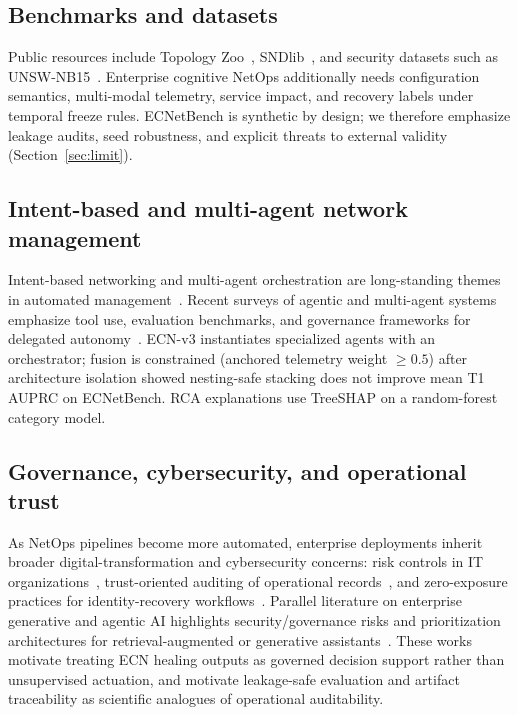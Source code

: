 \subsection{Benchmarks and datasets}
Public resources include Topology Zoo~\cite{knight2011topologyzoo}, SNDlib~\cite{orlowski2010sndlib}, and security datasets such as UNSW-NB15~\cite{moustafa2015unsw}. Enterprise cognitive NetOps additionally needs configuration semantics, multi-modal telemetry, service impact, and recovery labels under temporal freeze rules. ECNetBench is synthetic by design; we therefore emphasize leakage audits, seed robustness, and explicit threats to external validity (Section~\ref{sec:limit}).

\subsection{Intent-based and multi-agent network management}
Intent-based networking and multi-agent orchestration are long-standing themes in automated management~\cite{clemm2019ibn,wooldridge2009mas}. Recent surveys of agentic and multi-agent systems emphasize tool use, evaluation benchmarks, and governance frameworks for delegated autonomy~\cite{rah2026agenticreview,rah2026masreview}. ECN-v3 instantiates specialized agents with an orchestrator; fusion is constrained (anchored telemetry weight $\ge 0.5$) after architecture isolation showed nesting-safe stacking does not improve mean T1 AUPRC on ECNetBench. RCA explanations use TreeSHAP on a random-forest category model.

\subsection{Governance, cybersecurity, and operational trust}
As NetOps pipelines become more automated, enterprise deployments inherit broader digital-transformation and cybersecurity concerns: risk controls in IT organizations~\cite{rah2026cybercontrols}, trust-oriented auditing of operational records~\cite{rah2026auditing}, and zero-exposure practices for identity-recovery workflows~\cite{rah2026zeroexposure}. Parallel literature on enterprise generative and agentic AI highlights security/governance risks and prioritization architectures for retrieval-augmented or generative assistants~\cite{rah2026entgenai,rah2026raggovernance}. These works motivate treating ECN healing outputs as governed decision support rather than unsupervised actuation, and motivate leakage-safe evaluation and artifact traceability as scientific analogues of operational auditability.
